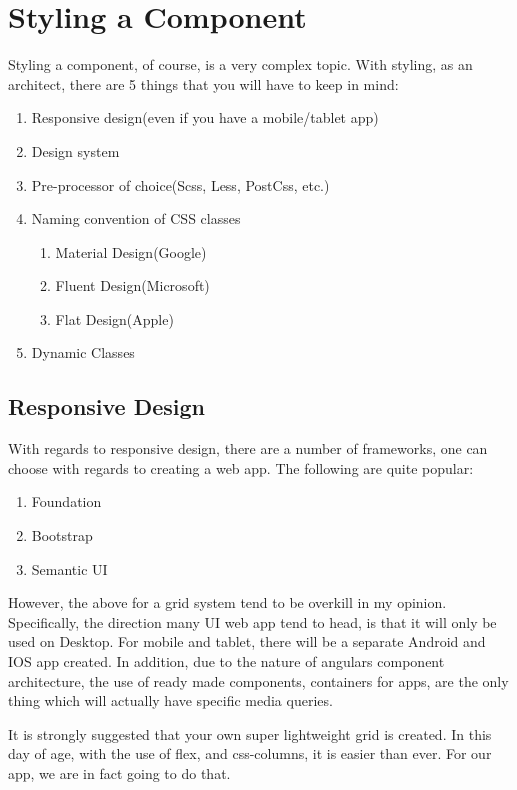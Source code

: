 \maketitle{}
\section{ Styling a Component }

Styling a component, of course, is a very complex topic. With styling, as an
architect, there are 5 things that you will have to keep in mind:
\begin{enumerate}
  \item Responsive design(even if you have a mobile/tablet app)
  \item Design system
  \item Pre-processor of choice(Scss, Less, PostCss, etc.)
  \item Naming convention of CSS classes
    \begin{enumerate}
      \item Material Design(Google)
      \item Fluent Design(Microsoft)
      \item Flat Design(Apple)
    \end{enumerate}
  \item Dynamic Classes
\end{enumerate}

\subsection{ Responsive Design }
With regards to responsive design, there are a number of frameworks, one can
choose with regards to creating a web app. The following are quite popular:
\begin{enumerate}
  \item Foundation
  \item Bootstrap
  \item Semantic UI
\end{enumerate}

However, the above for a grid system tend to be overkill in my opinion.
Specifically, the direction many UI web app tend to head, is that it will only
be used on Desktop. For mobile and tablet, there will be a separate Android and
IOS app created. In addition, due to the nature of angulars component
architecture, the use of ready made components, containers for apps, are the
only thing which will actually have specific media queries.

It is strongly suggested that your own super lightweight grid is created. In this
day of age, with the use of flex, and css-columns, it is easier than ever. For
our app, we are in fact going to do that.
